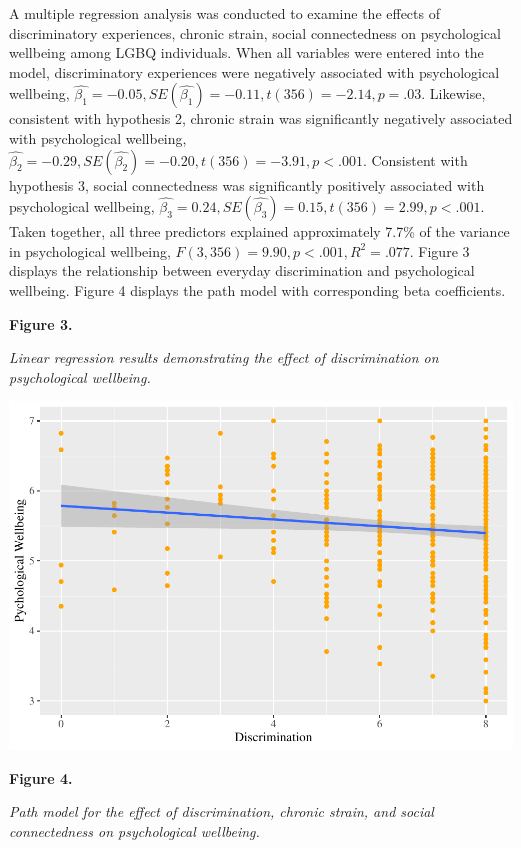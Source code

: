 \documentclass[
  english,
  man,floatsintext]{apa6}
\begin{document}
A multiple regression analysis was conducted to examine the effects of discriminatory experiences, chronic strain, social connectedness on psychological wellbeing among LGBQ individuals. When all variables were entered into the model, discriminatory experiences were negatively associated with psychological wellbeing, \(\hat{\beta_{1}}=-0.05, SE(\hat{\beta_{1}})=-0.11, t(356)=-2.14, p=.03\). Likewise, consistent with hypothesis 2, chronic strain was significantly negatively associated with psychological wellbeing, \(\hat{\beta_{2}}=-0.29, SE(\hat{\beta_{2}})=-0.20, t(356)=-3.91, p < .001\). Consistent with hypothesis 3, social connectedness was significantly positively associated with psychological wellbeing, \(\hat{\beta_{3}}=0.24, SE(\hat{\beta_{3}})=0.15, t(356)=2.99, p < .001\). Taken together, all three predictors explained approximately 7.7\% of the variance in psychological wellbeing, \(F(3,356)=9.90, p<.001, R^{2}=.077\). Figure 3 displays the relationship between everyday discrimination and psychological wellbeing. Figure 4 displays the path model with corresponding beta coefficients.

\textbf{Figure 3.}

\emph{Linear regression results demonstrating the effect of discrimination on psychological wellbeing.}

\includegraphics{prep_script_files/figure-latex/regression plot-1.pdf}

\newpage

\textbf{Figure 4.}

\emph{Path model for the effect of discrimination, chronic strain, and social connectedness on psychological wellbeing.}
\end{document}
